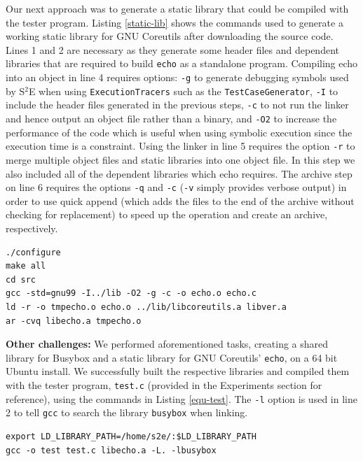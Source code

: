 \documentclass[conference]{IEEEtran}
\begin{document}
Our next approach was to generate a static library that could be compiled with the tester program. Listing \ref{static-lib} shows the commands used to generate a working static library for GNU Coreutils after downloading the source code. Lines 1 and 2 are necessary as they generate some header files and dependent libraries that are required to build {\tt echo} as a standalone program. Compiling echo into an object in line 4 requires options: {\tt -g} to generate debugging symbols used by S$^2$E when using {\tt ExecutionTracers} such as the {\tt TestCaseGenerator}, {\tt -I} to include the header files generated in the previous steps, {\tt -c} to not run the linker and hence output an object file rather than a binary, and {\tt -O2} to increase the performance of the code which is useful when using symbolic execution since the execution time is a constraint. Using the linker in line 5 requires the option {\tt -r} to merge multiple object files and static libraries into one object file. In this step we also included all of the dependent libraries which echo requires. The archive step on line 6 requires the options {\tt -q} and {\tt -c} ({\tt -v} simply provides verbose output) in order to use quick append (which adds the files to the end of the archive without checking for replacement) to speed up the operation and create an archive, respectively. \\

\begin{lstlisting}[style=bash, label=static-lib, abovecaptionskip=2ex, captionpos=b, caption={Commands for building GNU Coreutils as a static library}]
./configure
make all
cd src
gcc -std=gnu99 -I../lib -O2 -g -c -o echo.o echo.c
ld -r -o tmpecho.o echo.o ../lib/libcoreutils.a libver.a
ar -cvq libecho.a tmpecho.o
\end{lstlisting}

\textbf{Other challenges:} We performed aforementioned tasks, creating a shared library for Busybox and a static library for GNU Coreutils' {\tt echo}, on a 64 bit Ubuntu install. We successfully built the respective libraries and compiled them with the tester program, {\tt test.c} (provided in the Experiments section for reference), using the commands in Listing \ref{equ-test}. The {\tt -l} option is used in line 2 to tell {\tt gcc} to search the library {\tt busybox} when linking. \\
	 
\begin{lstlisting}[style=bash, label=equ-test, abovecaptionskip=2ex, captionpos=b, caption={Commands for building GNU Coreutils as a static library}]
export LD_LIBRARY_PATH=/home/s2e/:$LD_LIBRARY_PATH
gcc -o test test.c libecho.a -L. -lbusybox
\end{lstlisting}
\end{document}
